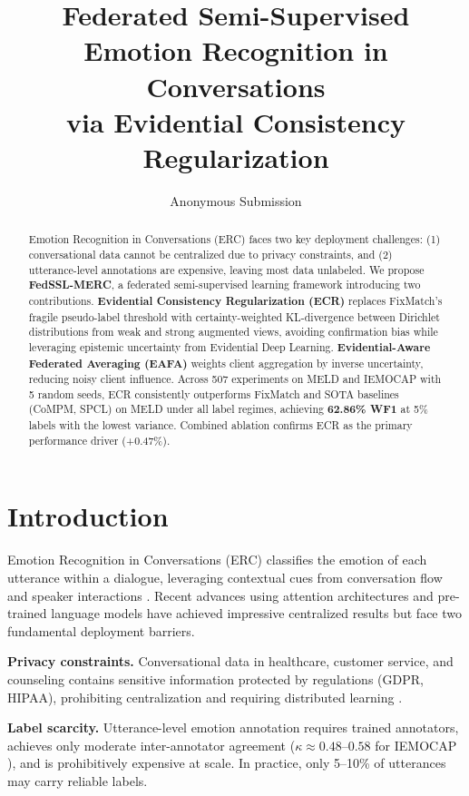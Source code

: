 \documentclass[letterpaper]{article}
\title{Federated Semi-Supervised Emotion Recognition in Conversations \\
via Evidential Consistency Regularization}
\author{Anonymous Submission}
\newcommand{\method}{FedSSL-MERC}
\newcommand{\ecr}{ECR}
\newcommand{\eafa}{EAFA}
\begin{document}
\maketitle

\begin{abstract}
Emotion Recognition in Conversations (ERC) faces two key deployment challenges:
(1) conversational data cannot be centralized due to privacy constraints, and
(2) utterance-level annotations are expensive, leaving most data unlabeled.
We propose \textbf{\method{}}, a federated semi-supervised learning framework
introducing two contributions. \textbf{Evidential Consistency Regularization (\ecr{})}
replaces FixMatch's fragile pseudo-label threshold with certainty-weighted
KL-divergence between Dirichlet distributions from weak and strong augmented views,
avoiding confirmation bias while leveraging epistemic uncertainty from Evidential
Deep Learning. \textbf{Evidential-Aware Federated Averaging (\eafa{})} weights
client aggregation by inverse uncertainty, reducing noisy client influence.
Across 507 experiments on MELD and IEMOCAP with 5 random seeds, ECR consistently
outperforms FixMatch and SOTA baselines (CoMPM, SPCL) on MELD under all label
regimes, achieving \textbf{62.86\% WF1} at 5\% labels with the lowest variance.
Combined ablation confirms ECR as the primary performance driver (+0.47\%).
\end{abstract}

\section{Introduction}

Emotion Recognition in Conversations (ERC) classifies the emotion of each utterance
within a dialogue, leveraging contextual cues from conversation flow and speaker
interactions \cite{poria2019emotion}. Recent advances using attention architectures
\cite{majumder2019dialoguernn,ghosal2019dialoguegcn} and pre-trained language models
\cite{lee2022compm,song2022spcl} have achieved impressive centralized results but
face two fundamental deployment barriers.

\textbf{Privacy constraints.} Conversational data in healthcare, customer service,
and counseling contains sensitive information protected by regulations (GDPR, HIPAA),
prohibiting centralization and requiring distributed learning \cite{mcmahan2017communication}.

\textbf{Label scarcity.} Utterance-level emotion annotation requires trained
annotators, achieves only moderate inter-annotator agreement ($\kappa \approx
0.48$--$0.58$ for IEMOCAP \cite{busso2008iemocap}), and is prohibitively expensive
at scale. In practice, only 5--10\% of utterances may carry reliable labels.
\end{document}
